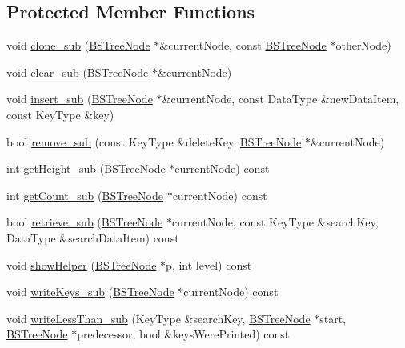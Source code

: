 \subsection*{\-Protected \-Member \-Functions}
\begin{DoxyCompactItemize}
\item 
void \hyperlink{class_b_s_tree_afde91fa451ee2bfccb29a83dc73856c5}{clone\-\_\-sub} (\hyperlink{class_b_s_tree_1_1_b_s_tree_node}{\-B\-S\-Tree\-Node} $\ast$\&current\-Node, const \hyperlink{class_b_s_tree_1_1_b_s_tree_node}{\-B\-S\-Tree\-Node} $\ast$other\-Node)
\item 
void \hyperlink{class_b_s_tree_ac1afa7d8d954f58664c3ad4765ee01d2}{clear\-\_\-sub} (\hyperlink{class_b_s_tree_1_1_b_s_tree_node}{\-B\-S\-Tree\-Node} $\ast$\&current\-Node)
\item 
void \hyperlink{class_b_s_tree_a9b49fb07e0b7f42ae5e9476356554176}{insert\-\_\-sub} (\hyperlink{class_b_s_tree_1_1_b_s_tree_node}{\-B\-S\-Tree\-Node} $\ast$\&current\-Node, const \-Data\-Type \&new\-Data\-Item, const \-Key\-Type \&key)
\item 
bool \hyperlink{class_b_s_tree_ad55ac383f8663423ceef8ddb2ea9758b}{remove\-\_\-sub} (const \-Key\-Type \&delete\-Key, \hyperlink{class_b_s_tree_1_1_b_s_tree_node}{\-B\-S\-Tree\-Node} $\ast$\&current\-Node)
\item 
int \hyperlink{class_b_s_tree_a3b5acf5303ea40326546b6b14ca3837c}{get\-Height\-\_\-sub} (\hyperlink{class_b_s_tree_1_1_b_s_tree_node}{\-B\-S\-Tree\-Node} $\ast$current\-Node) const 
\item 
int \hyperlink{class_b_s_tree_a73594cb9555a1ce6d2146f213e654da8}{get\-Count\-\_\-sub} (\hyperlink{class_b_s_tree_1_1_b_s_tree_node}{\-B\-S\-Tree\-Node} $\ast$current\-Node) const 
\item 
bool \hyperlink{class_b_s_tree_af9cc2368aa083c472ac701fd20dde36e}{retrieve\-\_\-sub} (\hyperlink{class_b_s_tree_1_1_b_s_tree_node}{\-B\-S\-Tree\-Node} $\ast$current\-Node, const \-Key\-Type \&search\-Key, \-Data\-Type \&search\-Data\-Item) const 
\item 
void \hyperlink{class_b_s_tree_a44b3002e3476eb410468a4b9aaaa73ef}{show\-Helper} (\hyperlink{class_b_s_tree_1_1_b_s_tree_node}{\-B\-S\-Tree\-Node} $\ast$p, int level) const 
\item 
void \hyperlink{class_b_s_tree_a1762a56d5bfc2164566156605cf98f36}{write\-Keys\-\_\-sub} (\hyperlink{class_b_s_tree_1_1_b_s_tree_node}{\-B\-S\-Tree\-Node} $\ast$current\-Node) const 
\item 
void \hyperlink{class_b_s_tree_a86e2419aa9bba28935b22d5c94822c29}{write\-Less\-Than\-\_\-sub} (\-Key\-Type \&search\-Key, \hyperlink{class_b_s_tree_1_1_b_s_tree_node}{\-B\-S\-Tree\-Node} $\ast$start, \hyperlink{class_b_s_tree_1_1_b_s_tree_node}{\-B\-S\-Tree\-Node} $\ast$predecessor, bool \&keys\-Were\-Printed) const 
\end{DoxyCompactItemize}
